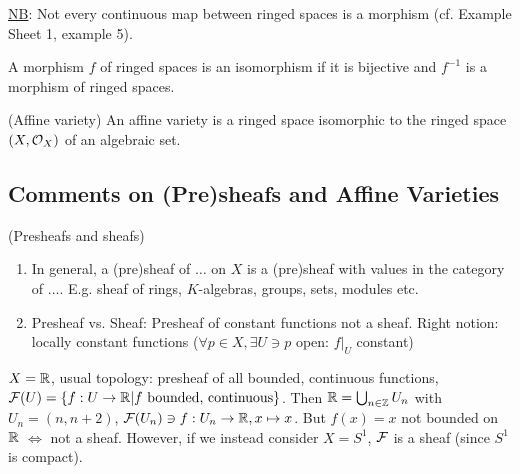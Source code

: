 \documentclass[a4paper,11pt]{article}
\begin{document}
			\noindent\underline{NB}: Not every continuous map between ringed spaces is a morphism (cf. Example Sheet 1, example 5).

			\begin{defi}
				A morphism $f$ of ringed spaces is an isomorphism if it is bijective and $f^{-1}$ is a morphism of ringed spaces.
			\end{defi}

			\begin{defi}
				(Affine variety) An affine variety is a ringed space isomorphic to the ringed space $(X,\mathcal{O}_X)$ of an algebraic set.
			\end{defi}

			{\color{gray}\subsection*{Comments on (Pre)sheafs and Affine Varieties}

				\begin{remark}(Presheafs and sheafs)
					\begin{enumerate}
						\item In general, a (pre)sheaf of $\dots$ on $X$ is a (pre)sheaf with values in the category of $\dots$. E.g. sheaf of rings, $K$-algebras, groups, sets, modules etc.
						\item Presheaf vs. Sheaf: Presheaf of constant functions not a sheaf. Right notion: locally constant functions ($\forall p\in X, \exists U\ni p$ open: $f|_U$ constant)  
					\end{enumerate}
				\end{remark}

				\begin{eg}
					$X=\mathbb{R}$, usual topology: presheaf of all bounded, continuous functions, $\mathcal{F}(U)=\{f:U\rightarrow\mathbb{R}|f\text{ bounded, continuous}\}$. Then $\mathbb{R}=\bigcup_{n\in\mathbb{Z}}U_n$ with $U_n=(n,n+2)$, $\mathcal{F}(U_n)\ni f:U_n\rightarrow\mathbb{R},x\mapsto x$. But $f(x)=x$ not bounded on $\mathbb{R}$ $\Longleftrightarrow$ not a sheaf. However, if we instead consider $X=S^1$, $\mathcal{F}$ is a sheaf (since $S^1$ is compact).
				\end{eg}

}
\end{document}
